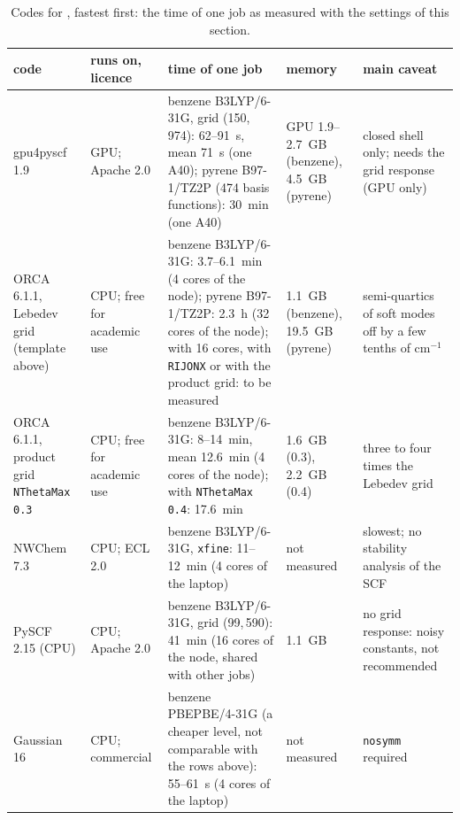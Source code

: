\begin{table}[htbp]
\small
\caption{Codes for , fastest first: the time of one job
as measured with the settings of this section.}\label{tab:fd-codes}
\begin{tabular}{p{}p{}p{}p{}p{}}
\toprule
\raggedright code & \raggedright runs on, licence & \raggedright time of one job & \raggedright memory & \raggedright main caveat \tabularnewline
\midrule
\raggedright gpu4pyscf 1.9 &
  \raggedright GPU; Apache 2.0 &
  \raggedright benzene B3LYP/6-31G, grid (150,\,974): 62--91~s, mean 71~s (one A40);
  pyrene B97-1/TZ2P (474 basis functions): 30~min (one A40) &
  \raggedright GPU 1.9--2.7~GB (benzene), 4.5~GB (pyrene) &
  \raggedright closed shell only; needs the grid response (GPU only) \tabularnewline
\raggedright ORCA 6.1.1, Lebedev grid (template above) &
  \raggedright CPU; free for academic use &
  \raggedright benzene B3LYP/6-31G: 3.7--6.1~min (4 cores of the node);
  pyrene B97-1/TZ2P: 2.3~h (32 cores of the node); with 16 cores, with
  \texttt{RIJONX} or with the product grid: to be measured &
  \raggedright 1.1~GB (benzene), 19.5~GB (pyrene) &
  \raggedright semi-quartics of soft modes off by a few tenths of cm$^{-1}$ \tabularnewline
\raggedright ORCA 6.1.1, product grid \texttt{NThetaMax 0.3} &
  \raggedright CPU; free for academic use &
  \raggedright benzene B3LYP/6-31G: 8--14~min, mean 12.6~min (4 cores of the node);
  with \texttt{NThetaMax 0.4}: 17.6~min &
  \raggedright 1.6~GB (0.3), 2.2~GB (0.4) &
  \raggedright three to four times the Lebedev grid \tabularnewline
\raggedright NWChem 7.3 &
  \raggedright CPU; ECL 2.0 &
  \raggedright benzene B3LYP/6-31G, \texttt{xfine}: 11--12~min (4 cores of the laptop) &
  \raggedright not measured &
  \raggedright slowest; no stability analysis of the SCF \tabularnewline
\raggedright PySCF 2.15 (CPU) &
  \raggedright CPU; Apache 2.0 &
  \raggedright benzene B3LYP/6-31G, grid (99,\,590): 41~min (16 cores of the node,
  shared with other jobs) &
  \raggedright 1.1~GB &
  \raggedright no grid response: noisy constants, not recommended \tabularnewline
\raggedright Gaussian 16 &
  \raggedright CPU; commercial &
  \raggedright benzene PBEPBE/4-31G (a cheaper level, not comparable with the rows
  above): 55--61~s (4 cores of the laptop) &
  \raggedright not measured &
  \raggedright \texttt{nosymm} required \tabularnewline
\bottomrule
\end{tabular}
\end{table}

